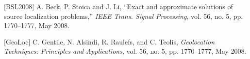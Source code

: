 \begin{frame}
\begin{thebibliography}{99}
[BSL2008] 
A. Beck, P. Stoica and J. Li,  ``Exact and approximate solutions of source localization problems,'' {\em IEEE Trans. Signal Processing}, vol. 56, no. 5, pp. 1770--1777, May 2008.

[GeoLoc] 
C. Gentile, N. Alsindi, R. Raulefs, and C. Teolis,   {\em Geolocation
Techniques: Principles and Applications}, vol. 56, no. 5, pp. 1770--1777, May 2008.
%
%
%
%

\end{thebibliography}


\end{frame}